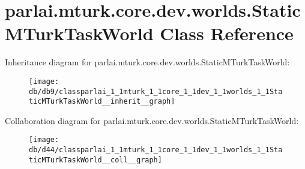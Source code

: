 \hypertarget{classparlai_1_1mturk_1_1core_1_1dev_1_1worlds_1_1StaticMTurkTaskWorld}{}\section{parlai.\+mturk.\+core.\+dev.\+worlds.\+Static\+M\+Turk\+Task\+World Class Reference}
\label{classparlai_1_1mturk_1_1core_1_1dev_1_1worlds_1_1StaticMTurkTaskWorld}


Inheritance diagram for parlai.\+mturk.\+core.\+dev.\+worlds.\+Static\+M\+Turk\+Task\+World\+:
\nopagebreak
\begin{figure}[H]
\begin{center}
\leavevmode
\texttt{[image: db/db9/classparlai\_1\_1mturk\_1\_1core\_1\_1dev\_1\_1worlds\_1\_1StaticMTurkTaskWorld\_\_inherit\_\_graph]}
\end{center}
\end{figure}


Collaboration diagram for parlai.\+mturk.\+core.\+dev.\+worlds.\+Static\+M\+Turk\+Task\+World\+:
\nopagebreak
\begin{figure}[H]
\begin{center}
\leavevmode
\texttt{[image: db/d44/classparlai\_1\_1mturk\_1\_1core\_1\_1dev\_1\_1worlds\_1\_1StaticMTurkTaskWorld\_\_coll\_\_graph]}
\end{center}
\end{figure}

